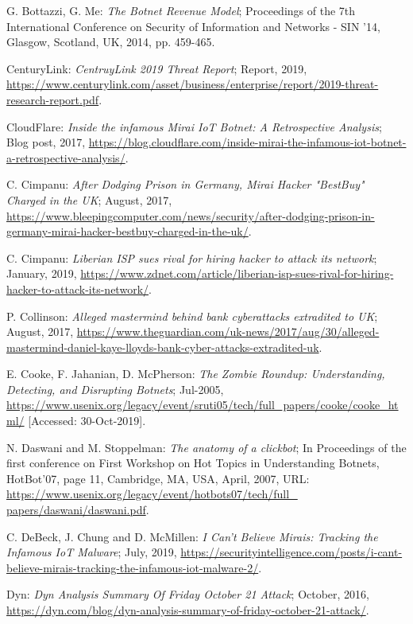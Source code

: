\begin{thebibliography}{99}
 G. Bottazzi, G. Me: \emph{The Botnet Revenue Model}; Proceedings of the 7th International Conference on Security of Information and Networks - SIN '14, Glasgow, Scotland, UK, 2014, pp. 459-465.

  CenturyLink: \emph{CentruyLink 2019 Threat Report}; Report, 2019, \url{https://www.centurylink.com/asset/business/enterprise/report/2019-threat-research-report.pdf}.

 CloudFlare: \emph{Inside the infamous Mirai IoT Botnet: A Retrospective Analysis}; Blog post, 2017, \url{https://blog.cloudflare.com/inside-mirai-the-infamous-iot-botnet-a-retrospective-analysis/}.

 C. Cimpanu: \emph{After Dodging Prison in Germany, Mirai Hacker "BestBuy" Charged in the UK}; August, 2017, \url{https://www.bleepingcomputer.com/news/security/after-dodging-prison-in-germany-mirai-hacker-bestbuy-charged-in-the-uk/}.

 C. Cimpanu: \emph{Liberian ISP sues rival for hiring hacker to attack its network}; January, 2019, \url{https://www.zdnet.com/article/liberian-isp-sues-rival-for-hiring-hacker-to-attack-its-network/}.

 P. Collinson: \emph{Alleged mastermind behind bank cyberattacks extradited to UK}; August, 2017, \url{https://www.theguardian.com/uk-news/2017/aug/30/alleged-mastermind-daniel-kaye-lloyds-bank-cyber-attacks-extradited-uk}.

 E. Cooke, F. Jahanian, D. McPherson: \emph{The Zombie Roundup: Understanding, Detecting, and Disrupting Botnets}; Jul-2005, \url{https://www.usenix.org/legacy/event/sruti05/tech/full_papers/cooke/cooke_html/} [Accessed: 30-Oct-2019].

 N. Daswani and M. Stoppelman: \emph{The anatomy of a clickbot}; In Proceedings of the first conference on First Workshop on Hot Topics in Understanding Botnets, HotBot'07, page 11, Cambridge, MA, USA, April, 2007, URL: \url{https://www.usenix.org/legacy/event/hotbots07/tech/full_ papers/daswani/daswani.pdf}.

 C. DeBeck, J. Chung and D. McMillen: \emph{I Can't Believe Mirais: Tracking the Infamous IoT Malware}; July, 2019, \url{https://securityintelligence.com/posts/i-cant-believe-mirais-tracking-the-infamous-iot-malware-2/}.

 Dyn: \emph{Dyn Analysis Summary Of Friday October 21 Attack}; October, 2016, \url{https://dyn.com/blog/dyn-analysis-summary-of-friday-october-21-attack/}.


\end{thebibliography}
